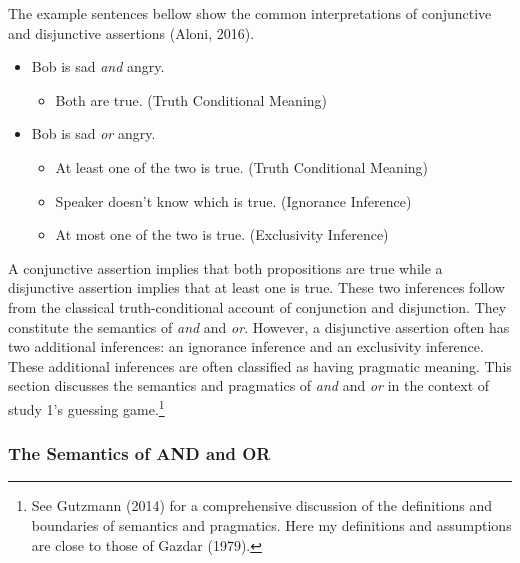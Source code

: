 \documentclass[oneside]{report}
\theoremstyle{definition}
\theoremstyle{definition}
\theoremstyle{definition}
\theoremstyle{remark}
\begin{document}
The example sentences bellow show the common interpretations of
conjunctive and disjunctive assertions (Aloni, 2016).
\begin{itemize}
\tightlist
\item
  Bob is sad \emph{and} angry.
  \begin{itemize}
  \tightlist
  \item
    Both are true. (Truth Conditional Meaning)
  \end{itemize}
\item
  Bob is sad \emph{or} angry.
  \begin{itemize}
  \tightlist
  \item
    At least one of the two is true. (Truth Conditional Meaning)
  \item
    Speaker doesn't know which is true. (Ignorance Inference)
  \item
    At most one of the two is true. (Exclusivity Inference)
  \end{itemize}
\end{itemize}
A conjunctive assertion implies that both propositions are true while a
disjunctive assertion implies that at least one is true. These two
inferences follow from the classical truth-conditional account of
conjunction and disjunction. They constitute the semantics of \emph{and}
and \emph{or}. However, a disjunctive assertion often has two additional
inferences: an ignorance inference and an exclusivity inference. These
additional inferences are often classified as having pragmatic meaning.
This section discusses the semantics and pragmatics of \emph{and} and
\emph{or} in the context of study 1's guessing game.\footnote{See
  Gutzmann (2014) for a comprehensive discussion of the definitions and
  boundaries of semantics and pragmatics. Here my definitions and
  assumptions are close to those of Gazdar (1979).}

\subsubsection{The Semantics of AND and
OR}\label{the-semantics-of-and-and-or}
\end{document}
